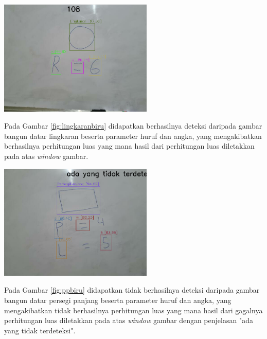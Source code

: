 \begin{center}
	\includegraphics[width=0.55\textwidth]{gambar/lingkaran biru.png}
	\label{fig:lingkaranbiru}
\end{center}
Pada Gambar \ref{fig:lingkaranbiru} didapatkan berhasilnya deteksi daripada gambar bangun datar lingkaran beserta parameter huruf dan angka, yang mengakibatkan berhasilnya perhitungan luas yang mana hasil dari perhitungan luas diletakkan pada atas \textit{window} gambar.

\begin{center}
	\includegraphics[width=0.55\textwidth]{gambar/persegipanjang biru.png}
	\label{fig:ppbiru}
\end{center}
Pada Gambar \ref{fig:ppbiru} didapatkan tidak berhasilnya deteksi daripada gambar bangun datar persegi panjang beserta parameter huruf dan angka, yang mengakibatkan tidak berhasilnya perhitungan luas yang mana hasil dari gagalnya perhitungan luas diletakkan pada atas \textit{window} gambar dengan penjelasan "ada yang tidak terdeteksi".

